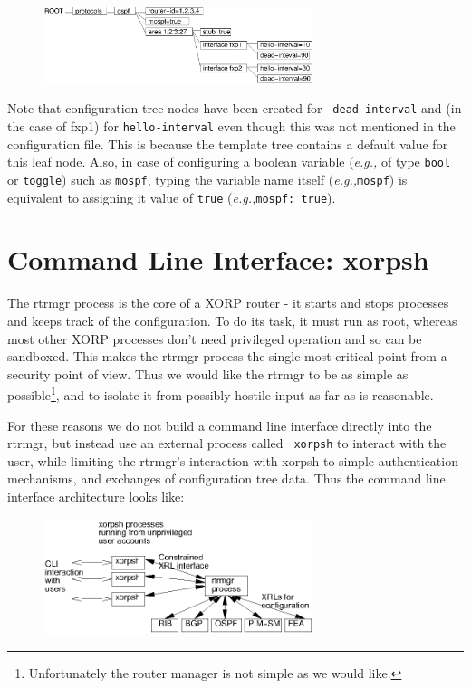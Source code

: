 \documentclass[11pt]{article}
\newcommand{\eg}{\emph{e.g.,}\xspace}
\begin{document}
\begin{figure}[htb]
\centerline{\includegraphics[width=0.7\textwidth]{figs/config}}
\vspace{.05in}
\end{figure}

Note that configuration tree nodes have been created for {\tt
dead-interval} and (in the case of fxp1) for {\tt hello-interval} even
though this was not mentioned in the configuration file.  This is
because the template tree contains a default value for this leaf node.
Also, in case of configuring a boolean variable (\eg of type {\tt bool} or
{\tt toggle}) such as {\tt mospf}, typing the variable name itself
(\eg \verb=mospf=) is equivalent to assigning it value of {\tt true}
(\eg \verb=mospf: true=).

\newpage

\section{Command Line Interface: xorpsh}

The rtrmgr process is the core of a XORP router - it starts and stops
processes and keeps track of the configuration.  To do its task, it
must run as root, whereas most other XORP processes don't need
privileged operation and so can be sandboxed.  This makes the rtrmgr
process the single most critical point from a security point of view.
Thus we would like the rtrmgr to be as simple as
possible\footnote{Unfortunately the router manager is not simple as we
would like.}, and to isolate it from possibly hostile input as far as
is reasonable.

For these reasons we do not build a command line interface directly
into the rtrmgr, but instead use an external process called {\tt
xorpsh} to interact with the user, while limiting the rtrmgr's
interaction with xorpsh to simple authentication mechanisms, and
exchanges of configuration tree data.  Thus the command line interface
architecture looks like:

\begin{figure}[htb]
\centerline{\includegraphics[width=0.7\textwidth]{figs/xorpsh}}
\vspace{.05in}
\end{figure}
\end{document}
